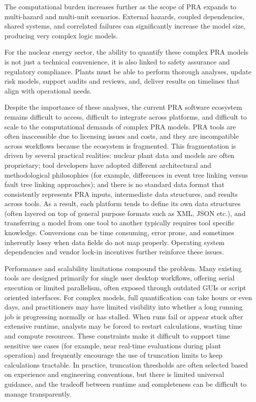The computational burden increases further as the scope of PRA expands to multi-hazard and multi-unit scenarios. External hazards, coupled dependencies, shared systems, and correlated failures can significantly increase the model size, producing very complex logic models.

For the nuclear energy sector, the ability to quantify these complex PRA models is not just a technical convenience, it is also linked to safety assurance and regulatory compliance. Plants must be able to perform thorough analyses, update risk models, support audits and reviews, and, deliver results on timelines that align with operational needs.

Despite the importance of these analyses, the current PRA software ecosystem remains difficult to access, difficult to integrate across platforms, and difficult to scale to the computational demands of complex PRA models. PRA tools are often inaccessible due to licensing issues and costs, and they are incompatible across workflows because the ecosystem is fragmented. This fragmentation is driven by several practical realities: nuclear plant data and models are often proprietary; tool developers have adopted different architectural and methodological philosophies (for example, differences in event tree linking versus fault tree linking approaches); and there is no standard data format that consistently represents PRA inputs, intermediate data structures, and results across tools. As a result, each platform tends to define its own data structures (often layered on top of general purpose formats such as XML, JSON etc.), and transferring a model from one tool to another typically requires tool specific knowledge. Conversions can be time consuming, error prone, and sometimes inherently lossy when data fields do not map properly. Operating system dependencies and vendor lock-in incentives further reinforce these issues.

Performance and scalability limitations compound the problem. Many existing tools are designed primarily for single user desktop workflows, offering serial execution or limited parallelism, often exposed through outdated GUIs or script oriented interfaces. For complex models, full quantification can take hours or even days, and practitioners may have limited visibility into whether a long running job is progressing normally or has stalled. When runs fail or appear stuck after extensive runtime, analysts may be forced to restart calculations, wasting time and compute resources. These constraints make it difficult to support time sensitive use cases (for example, near real-time evaluations during plant operation) and frequently encourage the use of truncation limits to keep calculations tractable. In practice, truncation thresholds are often selected based on experience and engineering conventions, but there is limited universal guidance, and the tradeoff between runtime and completeness can be difficult to manage transparently.


